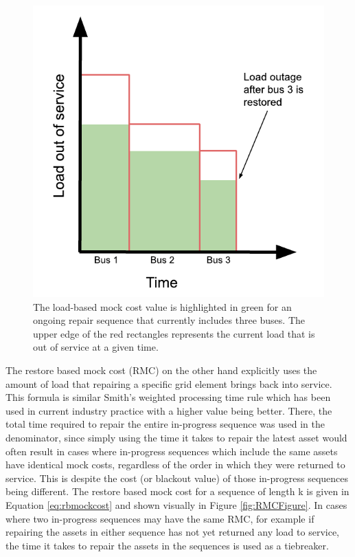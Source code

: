 \documentclass[12pt]{article}
\begin{document}
\begin{figure}[ht]
    \centering %
    \includegraphics[scale=0.8]{LMCFigure.pdf}
    \caption[Load based mock cost formula visualized]{The load-based mock cost value is highlighted in green for an ongoing repair sequence that currently includes three buses. The upper edge of the red rectangles represents the current load that is out of service at a given time.}
    \label{fig:LMCFigure}
\end{figure}
The restore based mock cost (RMC) on the other hand explicitly uses the amount of load that repairing a specific grid element brings back into service. This formula is similar Smith’s weighted processing time rule \cite{smith} which has been used in current industry practice \cite{tan} with a higher value being better. There, the total time required to repair the entire in-progress sequence was used in the denominator, since simply using the time it takes to repair the latest asset would often result in cases where in-progress sequences which include the same assets have identical mock costs, regardless of the order in which they were returned to service. This is despite the cost (or blackout value) of those in-progress sequences being different. The restore based mock cost for a sequence of length k is given in Equation \eqref{eq:rbmockcost} and shown visually in Figure \ref{fig:RMCFigure}. In cases where two in-progress sequences may have the same RMC, for example if repairing the assets in either sequence has not yet returned any load to service, the time it takes to repair the assets in the sequences is used as a tiebreaker.\par
\end{document}

